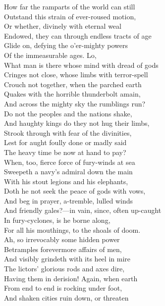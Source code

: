 How far the ramparts of the world can still\\
Outstand this strain of ever-roused motion,\\
Or whether, divinely with eternal weal\\
Endowed, they can through endless tracts of age\\
Glide on, defying the o'er-mighty powers\\
Of the immeasurable ages. Lo,\\
What man is there whose mind with dread of gods\\
Cringes not close, whose limbs with terror-spell\\
Crouch not together, when the parched earth\\
Quakes with the horrible thunderbolt amain,\\
And across the mighty sky the rumblings run?\\
Do not the peoples and the nations shake,\\
And haughty kings do they not hug their limbs,\\
Strook through with fear of the divinities,\\
Lest for aught foully done or madly said\\
The heavy time be now at hand to pay?\\
When, too, fierce force of fury-winds at sea\\
Sweepeth a navy's admiral down the main\\
With his stout legions and his elephants,\\
Doth he not seek the peace of gods with vows,\\
And beg in prayer, a-tremble, lulled winds\\
And friendly gales?—in vain, since, often up-caught\\
In fury-cyclones, is he borne along,\\
For all his mouthings, to the shoals of doom.\\
Ah, so irrevocably some hidden power\\
Betramples forevermore affairs of men,\\
And visibly grindeth with its heel in mire\\
The lictors' glorious rods and axes dire,\\
Having them in derision! Again, when earth\\
From end to end is rocking under foot,\\
And shaken cities ruin down, or threaten\\
